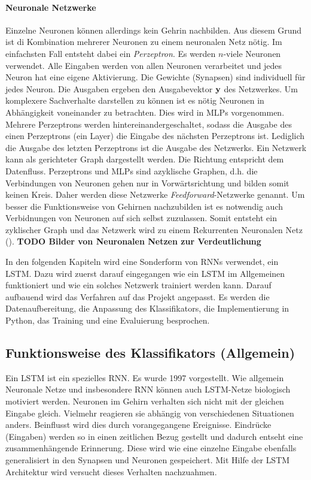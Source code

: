\paragraph{Neuronale Netzwerke}
Einzelne Neuronen können allerdings kein Gehrin nachbilden. Aus diesem Grund ist
di Kombination mehrerer Neuronen zu einem neuronalen Netz nötig. Im einfachsten
Fall entsteht dabei ein \textit{Perzeptron}. Es werden $n$-viele Neuronen
verwendet. Alle Eingaben werden von allen Neuronen verarbeitet und jedes Neuron
hat eine eigene Aktivierung. Die Gewichte (Synapsen) sind individuell für jedes
Neuron. Die Ausgaben ergeben den Ausgabevektor $\bf{y}$ des Netzwerkes. Um
komplexere Sachverhalte darstellen zu können ist es nötig Neuronen in
Abhängigkeit voneinander zu betrachten. Dies wird in \acp{MLP} vorgenommen.
Mehrere Perzeptrons werden hintereinandergeschaltet, sodass die Ausgabe des
einen Perzeptrons (ein Layer) die Eingabe des nächsten Perzeptrons ist.
Lediglich die Ausgabe des letzten Perzeptrons ist die Ausgabe des Netzwerks. 
Ein Netzwerk kann als gerichteter Graph dargestellt werden. Die Richtung
entspricht dem Datenfluss. Perzeptrons und \acp{MLP} sind azyklische Graphen,
d.h. die Verbindungen von Neuronen gehen nur in Vorwärtsrichtung und bilden
somit keinen Kreis. Daher werden diese Netzwerke \textit{Feedforward}-Netzwerke
genannt. Um besser die Funktionsweise von Gehirnen nachzubilden ist es
notwendig auch Verbidnungen von Neuronen auf sich selbst zuzulassen. Somit
entsteht ein zyklischer Graph und das Netzwerk wird zu einem Rekurrenten
Neuronalen Netz (). 
\textbf{TODO Bilder von Neuronalen Netzen zur Verdeutlichung}

In den folgenden Kapiteln wird eine Sonderform von \acp{RNN} verwendet, ein
\ac{LSTM}. Dazu wird zuerst darauf eingegangen wie ein \ac{LSTM} im
Allgemeinen funktioniert und wie ein solches Netzwerk trainiert werden kann.
Darauf aufbauend wird das Verfahren auf das Projekt angepasst. Es werden die
Datenaufbereitung, die Anpassung des Klassifikators, die Implementierung in
Python, das Training und eine Evaluierung besprochen. 


\subsection{Funktionsweise des Klassifikators (Allgemein)}

Ein \acl{LSTM} ist ein spezielles \ac{RNN}. Es wurde 1997
vorgestellt\cite{Hochreiter:1997}. Wie allgemein Neuronale Netze und
insbesondere \ac{RNN} können auch \ac{LSTM}-Netze biologisch motiviert werden.
Neuronen im Gehirn verhalten sich nicht mit der gleichen Eingabe gleich.
Vielmehr reagieren sie abhängig von verschiedenen Situationen anders. Beinflusst
wird dies durch vorangegangene Ereignisse. Eindrücke (Eingaben) werden so in
einen zeitlichen Bezug gestellt und dadurch entseht eine zusammenhängende
Erinnerung. Diese wird wie eine einzelne Eingabe ebenfalls generalisiert in den
Synapsen und Neuronen gespeichert. Mit Hilfe der \ac{LSTM} Architektur wird
versucht dieses Verhalten nachzuahmen. 

